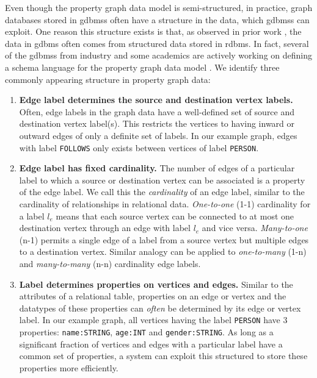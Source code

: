 \begin{guideline}
	\label{gdln:graph-schema}
	Even though the property graph data model is semi-structured, in practice, graph databases stored in \gls{gdbms}s often have a structure in the data, which \gls{gdbms}s can exploit. One reason this structure exists is that, as observed in prior work \cite{survey}, the data in \gls{gdbms} often comes from structured data stored in \gls{rdbms}. In fact, several of the \gls{gdbms}s from industry and some academics are actively working on defining a schema language for the property graph data model \cite{schema-validation-bonifati, defining-schema-hartig}. We identify three commonly appearing structure in property graph data:
	
	\begin{enumerate}
		
		\item \textbf{Edge label determines the source and destination vertex labels.} Often, edge labels in the graph data have a well-defined set of source and destination vertex label(s). This restricts the vertices to having inward or outward edges of only a definite set of labels. In our example graph, edges with label \texttt{FOLLOWS} only exists between vertices of label \texttt{PERSON}.
		
		\item \textbf{Edge label has fixed cardinality.} The number of edges of a particular label to which a source or destination vertex can be associated is a property of the edge label. We call this the \emph{cardinality} of an edge label, similar to the cardinality of relationships in relational data. \emph{One-to-one} (1-1) cardinality for a label $l_e$ means that each source vertex can be connected to at most one destination vertex through an edge with label $l_e$ and vice versa. \emph{Many-to-one} (n-1) permits a single edge of a label from a source vertex but multiple edges to a destination vertex. Similar analogy can be applied to \emph{one-to-many} (1-n) and \emph{many-to-many} (n-n) cardinality edge labels.
		
		\item \textbf{Label determines properties on vertices and edges.} Similar to the attributes of a relational table, properties on an edge or vertex and the datatypes of these properties can \emph{often} be determined by its edge or vertex label. In our example graph, all vertices having the label \texttt{PERSON} have 3 properties: \texttt{name:STRING}, \texttt{age:INT} and \texttt{gender:STRING}. As long as a significant fraction of vertices and edges with a particular label have a common set of properties, a system can exploit this structured to store these properties more efficiently. 
		

\end{enumerate}
\end{guideline}
